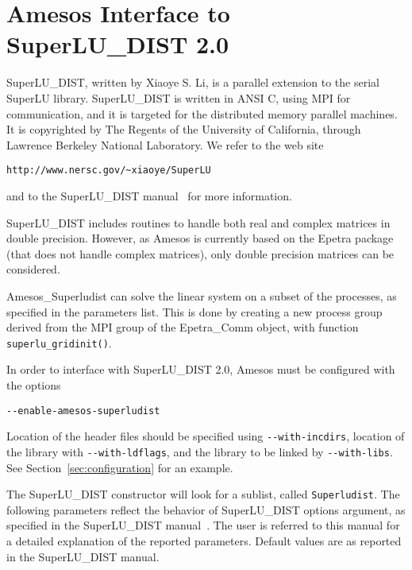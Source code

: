 \documentclass[11pt]{SANDreport}
\begin{document}
\section{Amesos Interface to SuperLU\_DIST 2.0}
\label{sec:superludist}

SuperLU\_DIST, written by Xiaoye S. Li, is a parallel extension to the
serial SuperLU library.  SuperLU\_DIST is written in ANSI C, using MPI
for communication, and it is targeted for the distributed memory
parallel machines. It is copyrighted by The Regents of the University of
California, through Lawrence Berkeley National Laboratory.  We refer to
the web site
\begin{verbatim}
http://www.nersc.gov/~xiaoye/SuperLU
\end{verbatim}
and to the SuperLU\_DIST manual~\cite{superlu-manual} for more
information.

SuperLU\_DIST includes routines to handle both real and complex matrices
in double precision. However, as Amesos is currently based on the Epetra
package (that does not handle complex matrices), only double precision
matrices can be considered.

Amesos\_Superludist can solve the linear system on a subset of the
processes, as specified in the parameters list. This is done by
creating a new process group derived from the MPI group of the
Epetra\_Comm object, with function \verb!superlu_gridinit()!. 

\medskip

In order to interface with SuperLU\_DIST 2.0, Amesos must be configured with
the options
\begin{verbatim}
--enable-amesos-superludist 
\end{verbatim}
Location of the header files should be specified using \verb!--with-incdirs!,
location of the library with \verb!--with-ldflags!, and the library
to be linked by \verb!--with-libs!. See Section~\ref{sec:configuration} for an
example.

\medskip

The SuperLU\_DIST constructor will look for a sublist, called
\verb!Superludist!.  The following parameters reflect the behavior of
SuperLU\_DIST options argument, as specified in the SuperLU\_DIST
manual~\cite[pages 55--56]{superlu-manual}. The user is referred to this
manual for a detailed explanation of the reported parameters. Default
values are as reported in the SuperLU\_DIST manual.
\end{document}
